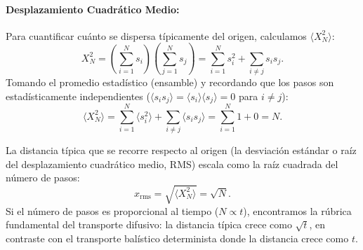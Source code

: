 \documentclass[12pt]{article}
\begin{document}
\paragraph{Desplazamiento Cuadrático Medio:}
Para cuantificar cuánto se dispersa típicamente del origen, calculamos $\langle X_N^2 \rangle$:
\begin{equation}
    X_N^2 = \left( \sum_{i=1}^N s_i \right)\left( \sum_{j=1}^N s_j \right) = \sum_{i=1}^N s_i^2 + \sum_{i \neq j} s_i s_j.
\end{equation}
Tomando el promedio estadístico (ensamble) y recordando que los pasos son estadísticamente independientes ($\langle s_i s_j \rangle = \langle s_i \rangle \langle s_j \rangle = 0$ para $i \neq j$):
\begin{equation}
    \langle X_N^2 \rangle = \sum_{i=1}^N \langle s_i^2 \rangle + \sum_{i \neq j} \langle s_i s_j \rangle = \sum_{i=1}^N 1 + 0 = N.
\end{equation}

\begin{cajaflex}
La distancia típica que se recorre respecto al origen (la desviación estándar o raíz del desplazamiento cuadrático medio, RMS) escala como la raíz cuadrada del número de pasos:
\begin{equation}
    x_{\text{rms}} = \sqrt{\langle X_N^2 \rangle} = \sqrt{N}.
\end{equation}
Si el número de pasos es proporcional al tiempo ($N \propto t$), encontramos la 
rúbrica fundamental del transporte difusivo: la distancia típica crece como 
$\sqrt{t}$, en contraste con el transporte balístico determinista donde la distancia crece como $t$.
\end{cajaflex}
\end{document}
